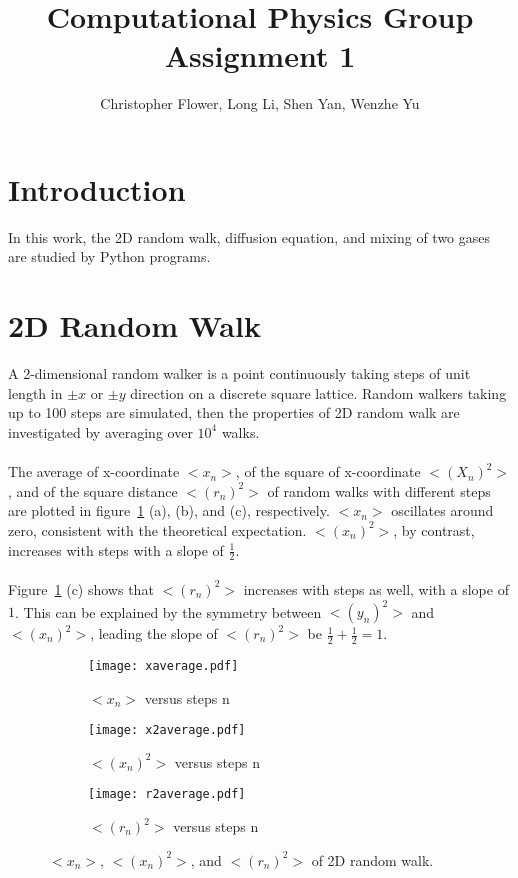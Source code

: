 \documentclass{article}
\begin{document}
\title{\textbf{Computational Physics Group Assignment 1}}
\author{Christopher Flower, Long Li, Shen Yan, Wenzhe Yu}
\maketitle

\section{Introduction}
In this work, the 2D random walk, diffusion equation, and mixing of two gases are studied by Python programs.

\section{2D Random Walk}
A 2-dimensional random walker is a point continuously taking steps of unit length in $\pm x$ or $\pm y$ direction on a discrete square lattice. Random walkers taking up to 100 steps are simulated, then the properties of 2D random walk are investigated by averaging over $10^4$ walks.\\
\\
The average of x-coordinate $<x_n>$, of the square of x-coordinate $<(X_n)^2>$, and of the square distance $<(r_n)^2>$ of random walks with different steps are plotted in figure~\ref{random} (a), (b), and (c), respectively. $<x_n>$ oscillates around zero, consistent with the theoretical expectation. $<(x_n)^2>$, by contrast, increases with steps with a slope of $\frac{1}{2}$.\\
\\
Figure~\ref{random} (c) shows that $<(r_n)^2>$ increases with steps as well, with a slope of $1$. This can be explained by the symmetry between  $<(y_n)^2>$ and $<(x_n)^2>$, leading the slope of $<(r_n)^2>$ be $\frac{1}{2}+\frac{1}{2} = 1$.\\

\begin{figure}[h!]
\centering
\begin{subfigure}[b]{0.32\textwidth}
\texttt{[image: xaverage.pdf]}
\caption{$<x_n>$ versus steps n}
\end{subfigure}
\begin{subfigure}[b]{0.32\textwidth}
\texttt{[image: x2average.pdf]}
\caption{$<(x_n)^2>$ versus steps n}
\end{subfigure}
\begin{subfigure}[b]{0.32\textwidth}
\texttt{[image: r2average.pdf]}
\caption{$<(r_n)^2>$ versus steps n}
\end{subfigure}
\caption{$<x_n>$, $<(x_n)^2>$, and $<(r_n)^2>$ of 2D random walk.}
\label{random}
\end{figure}
\end{document}
